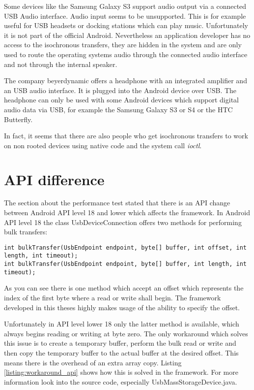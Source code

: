 Some devices like the Samsung Galaxy S3 support audio output via a connected USB Audio interface. Audio input seems to be unsupported. This is for example useful for USB headsets or docking stations which can play music. Unfortunately it is not part of the official Android. Nevertheless an application developer has no access to the isochronous transfers, they are hidden in the system and are only used to route the operating systems audio through the connected audio interface and not through the internal speaker.

The company beyerdynamic offers a headphone with an integrated amplifier and an USB audio interface. It is plugged into the Android device over USB. The headphone can only be used with some Android devices which support digital audio data via USB, for example the Samsung Galaxy S3 or S4 or the HTC Butterfly\cite{beyerdynamic}.

In fact, it seems that there are also people who get isochronous transfers to work on non rooted devices using native code and the system call \textit{ioctl}\cite{usb_audio_recorder, iso_stack}.

\chapter{API difference}
\label{chapter:api_diff}

The section about the performance test stated that there is an API change between Android API level 18 and lower which affects the framework. In Android API level 18 the class UsbDeviceConnection offers two methods for performing bulk transfers\cite{android_usb_dev_con}:

\lstset{language=Java}
\begin{lstlisting}[caption=Bulk transfers in UsbDeviceConnection., label=listing:wifi_connectg]
int bulkTransfer(UsbEndpoint endpoint, byte[] buffer, int offset, int length, int timeout);
int bulkTransfer(UsbEndpoint endpoint, byte[] buffer, int length, int timeout);
\end{lstlisting}

As you can see there is one method which accept an offset which represents the index of the first byte where a read or write shall begin. The framework developed in this theses highly makes usage of the ability to specify the offset.

Unfortunately in API level lower 18 only the latter method is available, which always begins reading or writing at byte zero. The only workaround which solves this issue is to create a temporary buffer, perform the bulk read or write and then copy the temporary buffer to the actual buffer at the desired offset. This means there is the overhead of an extra array copy. Listing \ref{listing:workaround_api} shows how this is solved in the framework. For more information look into the source code, especially UsbMassStorageDevice.java.

